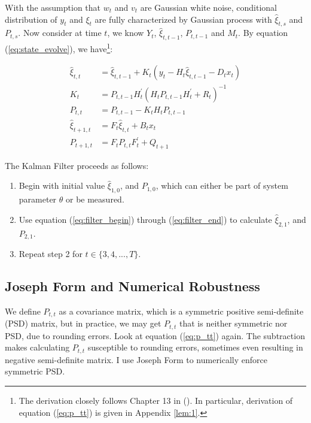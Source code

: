 \documentclass[12pt]{article}
\newenvironment{boenumerate}
    {\begin{enumerate}\renewcommand\labelenumi{\textbf\theenumi}}
    {\end{enumerate}}
\numberwithin{equation}{section}
\begin{document}
With the assumption that $w_t$ and $v_t$ are Gaussian white noise, conditional distribution of $y_t$ and $\xi_t$ are fully characterized by Gaussian process with $\hat{\xi}_{t,s}$ and $P_{t,s}$. Now consider at time $t$, we know $Y_t$, $\hat{\xi}_{t,t-1}$, $P_{t,t-1}$ and $M_t$. By equation (\ref{eq:state_evolve}), we have\footnote{The derivation closely follows Chapter 13 in (\cite{hamilton_1994}). In particular, derivation of equation (\ref{eq:p_tt}) is given in Appendix \ref{lem:1}.}:

\begin{align}
    \hat{\xi}_{t,t} &= \hat{\xi}_{t,t-1} + K_t(y_t-H_t\hat{\xi}_{t,t-1}-D_tx_t) \label{eq:filter_begin} \\
    K_t &= P_{t,t-1}H_t^{'}(H_tP_{t,t-1}H_t^{'}+R_t)^{-1} \label{eq:gain} \\
    P_{t,t} &= P_{t,t-1} - K_tH_tP_{t,t-1} \label{eq:p_tt} \\
    \hat{\xi}_{t+1,t} &= F_t\hat{\xi}_{t,t} + B_tx_t \\
    P_{t+1,t} &= F_tP_{t,t}F_t^{'}+Q_{t+1} \label{eq:filter_end}
\end{align}

The Kalman Filter proceeds as follows:

\begin{boenumerate}
    \item Begin with initial value $\hat{\xi}_{1,0}$, and $P_{1,0}$, which can either be part of system parameter $\theta$ or be measured. 
    \item Use equation (\ref{eq:filter_begin}) through (\ref{eq:filter_end}) to calculate $\hat{\xi}_{2,1}$, and $P_{2,1}$.
    \item Repeat step 2 for $t\in\{3, 4, ..., T\}$.
\end{boenumerate}

\subsection{Joseph Form and Numerical Robustness}

We define $P_{t,t}$ as a covariance matrix, which is a symmetric positive semi-definite (PSD) matrix, but in practice, we may get $P_{t,t}$ that is neither symmetric nor PSD, due to rounding errors. Look at equation (\ref{eq:p_tt}) again. The subtraction makes calculating $P_{t,t}$ susceptible to rounding errors, sometimes even resulting in negative semi-definite matrix. I use Joseph Form to numerically enforce symmetric PSD. 
\end{document}
